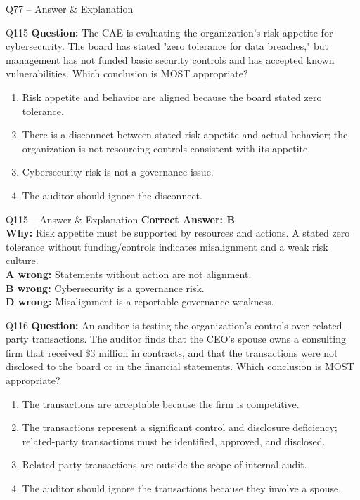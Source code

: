 \documentclass[aspectratio=169,10pt]{beamer}
\begin{document}
\begin{frame}[t]{Q77 -- Answer \& Explanation}
	\begin{frame}[t]{Q115}
		\small
		\textbf{Question:} The CAE is evaluating the organization's risk appetite for cybersecurity. The board has stated "zero tolerance for data breaches," but management has not funded basic security controls and has accepted known vulnerabilities. Which conclusion is MOST appropriate?
		\begin{enumerate}[label=\Alph*.,itemsep=1pt,topsep=2pt]
			\item Risk appetite and behavior are aligned because the board stated zero tolerance.
			\item There is a disconnect between stated risk appetite and actual behavior; the organization is not resourcing controls consistent with its appetite.
			\item Cybersecurity risk is not a governance issue.
			\item The auditor should ignore the disconnect.
		\end{enumerate}
	\end{frame}
	
	\begin{frame}[t]{Q115 -- Answer \& Explanation}
		\small
		\textbf{Correct Answer: B} \\[4pt]
		\textbf{Why:} Risk appetite must be supported by resources and actions. A stated zero tolerance without funding/controls indicates misalignment and a weak risk culture. \\[4pt]
		\textbf{A wrong:} Statements without action are not alignment. \\[2pt]
		\textbf{B wrong:} Cybersecurity is a governance risk. \\[2pt]
		\textbf{D wrong:} Misalignment is a reportable governance weakness.
	\end{frame}
	

\begin{frame}[t]{Q116}
	\small
	\textbf{Question:} An auditor is testing the organization's controls over related-party transactions. The auditor finds that the CEO's spouse owns a consulting firm that received \$3 million in contracts, and that the transactions were not disclosed to the board or in the financial statements. Which conclusion is MOST appropriate?
	\begin{enumerate}[label=\Alph*.,itemsep=1pt,topsep=2pt]
		\item The transactions are acceptable because the firm is competitive.
		\item The transactions represent a significant control and disclosure deficiency; related-party transactions must be identified, approved, and disclosed.
		\item Related-party transactions are outside the scope of internal audit.
		\item The auditor should ignore the transactions because they involve a spouse.
	\end{enumerate}
\end{frame}


\end{frame}
\end{document}
